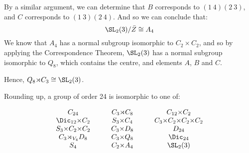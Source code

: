 \begin{enumerate}
        By a similar argument, we can determine that \(B\) corresponds to \((1\ 4)(2\ 3)\), and \(C\) corresponds to
        \((1\ 3)(2\ 4)\).
        And so we can conclude that:
        \[\SL_2(3)/\bar{Z} \cong A_4\]
        We know that \(A_4\) has a normal subgroup isomorphic to \(C_2 {\times} C_{2}\), and so by applying the
        Correspondence Theorem, \(\SL_2(3)\) has a normal subgroup isomorphic to \(Q_8\), which contains the centre, and
        elements \(A\), \(B\) and \(C\).

        Hence, \(Q_8 {\rtimes} C_3 \cong \SL_2(3)\).

\end{enumerate}

Rounding up, a group of order 24 is isomorphic to one of:

\begin{displaymath}
\begin{array}{c@{\hskip 3em}c@{\hskip 3em}c}
    C_{24} & C_3{\rtimes}C_8 & C_{12}{\times}C_2 \\
    \Dic_{12}{\times}C_2 & S_3{\times}C_4 & C_3{\times}C_2{\times}C_2{\times}C_2 \\
    S_3{\times}C_2{\times}C_2 & C_3{\times}D_8 & D_{24} \\
    C_3{\rtimes_{V_4}}D_8 & C_3{\times}Q_8 & \Dic_{24} \\
    S_4 & C_2{\times}A_4 & \SL_2(3)
\end{array}
\end{displaymath}
